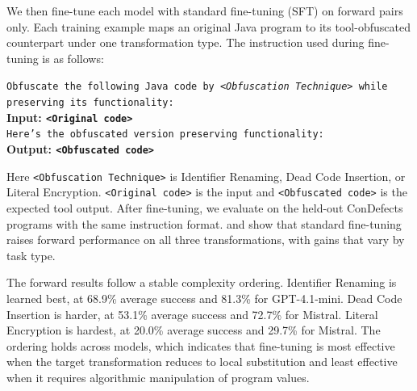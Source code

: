 
We then fine-tune each model with standard fine-tuning (SFT) on forward pairs
only. Each training example maps an original Java program to its
tool-obfuscated counterpart under one transformation type.
The instruction used during fine-tuning is
as follows:

\begin{tcolorbox}[colback=cyan!5, colframe=cyan!25, coltitle=black,
  title=Fine-Tuning Prompt Template, boxrule=0.4pt, left=2pt, right=2pt,
  top=2pt, bottom=2pt]
\small\texttt{Obfuscate the following Java code by \textit{<Obfuscation Technique>}
while preserving its functionality:}\\
\small\textbf{Input: \texttt{<Original code>}} \\
\small\texttt{Here's the obfuscated version preserving functionality:}\\
\small\textbf{Output: \texttt{<Obfuscated code>}}
\end{tcolorbox}

\noindent
Here \texttt{<Obfuscation Technique>} is Identifier Renaming, Dead Code
Insertion, or Literal Encryption. \texttt{<Original code>} is the input and
\texttt{<Obfuscated code>} is the expected tool output. After fine-tuning, we
evaluate on the held-out ConDefects programs with the same instruction format.
 and  show that
standard fine-tuning raises forward performance on all three transformations,
with gains that vary by task type.

The forward results follow a stable complexity ordering. Identifier Renaming is
learned best, at 68.9\% average success and 81.3\% for GPT-4.1-mini. Dead Code Insertion is harder, at 53.1\% average success and 72.7\% for Mistral. Literal Encryption is hardest, at 20.0\% average success and 29.7\% for Mistral. The ordering holds across models, which indicates that fine-tuning is most effective
when the target transformation reduces to local substitution and least effective
when it requires algorithmic manipulation of program values.



